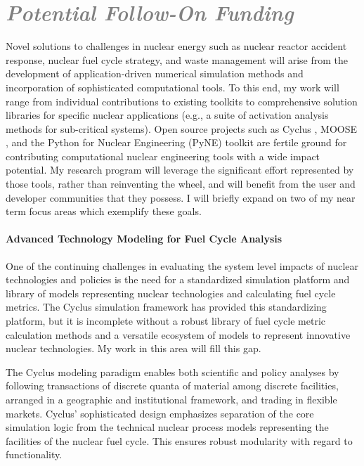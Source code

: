 \documentclass[a4paper, 12pt]{article}
\begin{document}
\section*{\textcolor{gray}{\it Potential Follow-On Funding }}
Novel solutions to challenges in nuclear energy such as nuclear reactor accident 
response, nuclear fuel cycle strategy, and waste management will arise from the  
development of application-driven numerical simulation methods and incorporation 
of sophisticated computational tools. To this end, my work will range from 
individual contributions to existing toolkits to comprehensive solution 
libraries for specific nuclear applications (e.g., a suite of activation 
analysis methods for sub-critical systems). Open source projects such as 
Cyclus \cite{huff_cyclus_2011}, MOOSE \cite{gaston_moose:_2009}, and the Python 
for Nuclear Engineering (PyNE) toolkit \cite{pyne_pyne_2011} are fertile ground 
for contributing computational nuclear engineering tools with a wide impact 
potential. My research program will leverage the significant effort represented 
by those tools, rather than reinventing the wheel, and will benefit from the 
user and developer communities that they possess.  I will briefly expand on two 
of my near term focus areas which exemplify these goals. 

\paragraph{Advanced Technology Modeling for Fuel Cycle Analysis} 

One of the continuing challenges in evaluating the system level impacts of 
nuclear technologies and policies is the need for a standardized simulation 
platform and library of models representing nuclear technologies and calculating 
fuel cycle metrics.  The Cyclus simulation framework 
has provided this standardizing platform, but it is incomplete without a 
robust library of fuel cycle metric calculation methods and a versatile ecosystem of 
models to represent innovative nuclear technologies. My work in this area will 
fill this gap. 

The Cyclus modeling paradigm enables both scientific and policy analyses by 
following transactions of discrete quanta of material among discrete facilities, 
arranged in a geographic and institutional framework, and trading in flexible 
markets. Cyclus' sophisticated design emphasizes separation of the core simulation logic 
from the technical nuclear process models representing the facilities of the 
nuclear fuel cycle. This ensures robust modularity with regard to functionality.  
\end{document}
